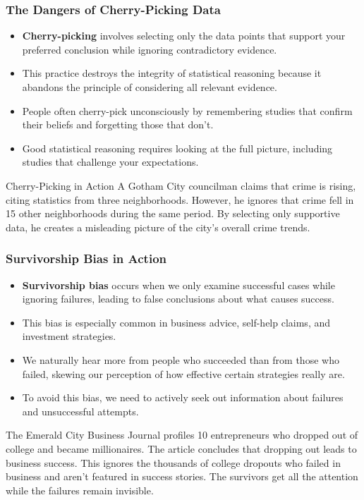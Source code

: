 \documentclass{beamer}
\begin{document}
\begin{frame}
	\frametitle{The Dangers of Cherry-Picking Data}
	
	\begin{itemize}
		\item \textbf{Cherry-picking} involves selecting only the data points that support your preferred conclusion while ignoring contradictory evidence.
		\item This practice destroys the integrity of statistical reasoning because it abandons the principle of considering all relevant evidence.
		\item People often cherry-pick unconsciously by remembering studies that confirm their beliefs and forgetting those that don't.
		\item Good statistical reasoning requires looking at the full picture, including studies that challenge your expectations.
	\end{itemize}
	
	\begin{alertblock}{Cherry-Picking in Action}
		A Gotham City councilman claims that crime is rising, citing statistics from three neighborhoods. However, he ignores that crime fell in 15 other neighborhoods during the same period. By selecting only supportive data, he creates a misleading picture of the city's overall crime trends.
	\end{alertblock}
	
\end{frame}

\begin{frame}
	\frametitle{Survivorship Bias in Action}
	
	\begin{itemize}
		\item \textbf{Survivorship bias} occurs when we only examine successful cases while ignoring failures, leading to false conclusions about what causes success.
		\item This bias is especially common in business advice, self-help claims, and investment strategies.
		\item We naturally hear more from people who succeeded than from those who failed, skewing our perception of how effective certain strategies really are.
		\item To avoid this bias, we need to actively seek out information about failures and unsuccessful attempts.
	\end{itemize}
	
	\begin{example}
		The Emerald City Business Journal profiles 10 entrepreneurs who dropped out of college and became millionaires. The article concludes that dropping out leads to business success. This ignores the thousands of college dropouts who failed in business and aren't featured in success stories. The survivors get all the attention while the failures remain invisible.
		\end{example}
			
		\end{frame}
		
\end{document}
